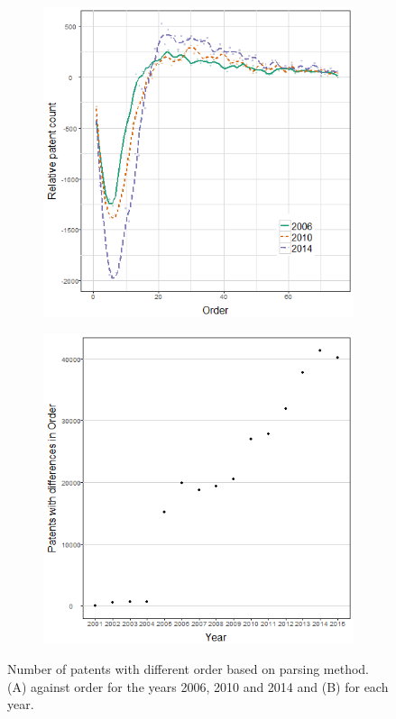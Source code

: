\begin{figure}
\centering
\begin{subfigure}{.5\textwidth}
  \centering
  \includegraphics[width=.9\linewidth]{Figures/parsingErrorsPerOrder}
 \caption[]{}
\label{fig:parsingErrorsPerOrder}
\end{subfigure}%
\begin{subfigure}{.5\textwidth}
  \centering
  \includegraphics[width=0.9\linewidth]{Figures/parsingErrorsPerYear}
  \caption[]{}
\label{fig:parsingErrorsPerYear}
\end{subfigure}
\caption[Differences in different parsing methods]{Number of patents with different order based on parsing method. (A) against order for the years 2006, 2010 and 2014 and (B) for each year.}
\label{fig:parsingErrors}
\end{figure}


